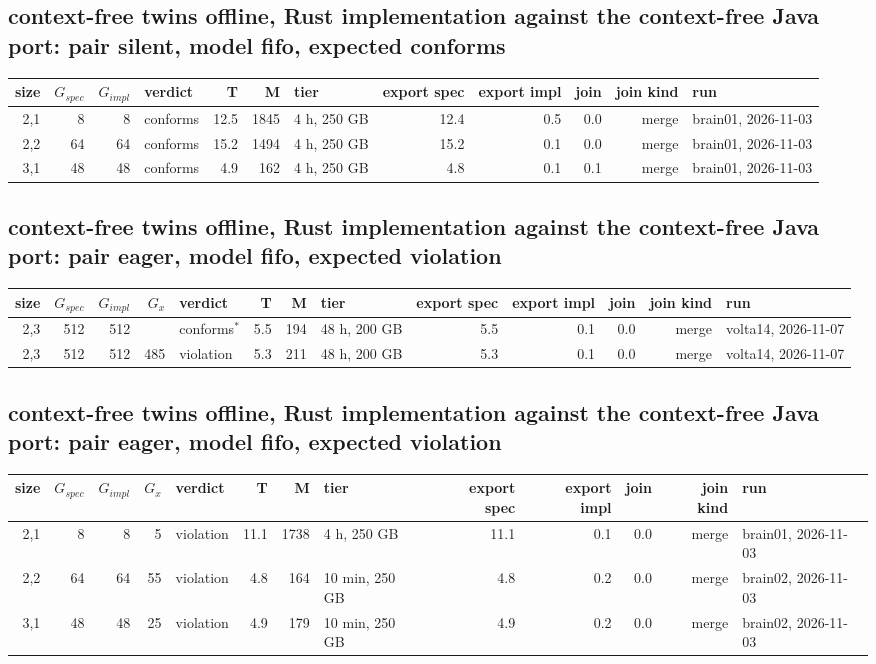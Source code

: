 \documentclass[10pt]{article}
\begin{document}
\subsection*{context-free twins offline, Rust implementation against the context-free Java port: pair \textsf{silent}, model fifo, expected conforms}
\begin{longtable}{@{}rrrlrrlrrrrl@{}}
\toprule
size & $G_{\mathit{spec}}$ & $G_{\mathit{impl}}$ & verdict & T & M & tier & export spec & export impl & join & join kind & run \\
\midrule
\endhead
\color{blue} 2,1 & 8 & 8 & conforms & 12.5 & 1845 & 4 h, 250 GB & 12.4 & 0.5 & 0.0 & merge & brain01, 2026-11-03 \\
\color{blue} 2,2 & 64 & 64 & conforms & 15.2 & 1494 & 4 h, 250 GB & 15.2 & 0.1 & 0.0 & merge & brain01, 2026-11-03 \\
\color{blue} 3,1 & 48 & 48 & conforms & 4.9 & 162 & 4 h, 250 GB & 4.8 & 0.1 & 0.1 & merge & brain01, 2026-11-03 \\
\bottomrule
\end{longtable}
\subsection*{context-free twins offline, Rust implementation against the context-free Java port: pair \textsf{eager}, model fifo, expected violation}
\begin{longtable}{@{}rrrrlrrlrrrrl@{}}
\toprule
size & $G_{\mathit{spec}}$ & $G_{\mathit{impl}}$ & $G_x$ & verdict & T & M & tier & export spec & export impl & join & join kind & run \\
\midrule
\endhead
\color{red} 2,3 & 512 & 512 &  & conforms$^{\ast}$ & 5.5 & 194 & 48 h, 200 GB & 5.5 & 0.1 & 0.0 & merge & volta14, 2026-11-07 \\
\color{red} 2,3 & 512 & 512 & 485 & violation & 5.3 & 211 & 48 h, 200 GB & 5.3 & 0.1 & 0.0 & merge & volta14, 2026-11-07 \\
\bottomrule
\end{longtable}
\subsection*{context-free twins offline, Rust implementation against the context-free Java port: pair \textsf{eager}, model fifo, expected violation}
\begin{longtable}{@{}rrrrlrrlrrrrl@{}}
\toprule
size & $G_{\mathit{spec}}$ & $G_{\mathit{impl}}$ & $G_x$ & verdict & T & M & tier & export spec & export impl & join & join kind & run \\
\midrule
\endhead
\color{blue} 2,1 & 8 & 8 & 5 & violation & 11.1 & 1738 & 4 h, 250 GB & 11.1 & 0.1 & 0.0 & merge & brain01, 2026-11-03 \\
\color{blue} 2,2 & 64 & 64 & 55 & violation & 4.8 & 164 & 10 min, 250 GB & 4.8 & 0.2 & 0.0 & merge & brain02, 2026-11-03 \\
\color{blue} 3,1 & 48 & 48 & 25 & violation & 4.9 & 179 & 10 min, 250 GB & 4.9 & 0.2 & 0.0 & merge & brain02, 2026-11-03 \\
\bottomrule
\end{longtable}
\end{document}

